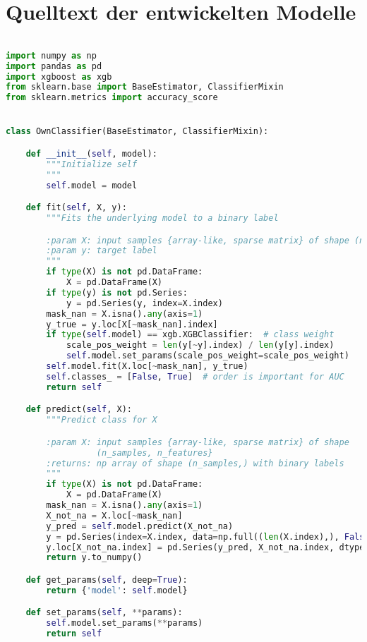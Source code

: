 \chapter{Quelltext der entwickelten Modelle}

\begin{lstlisting}[language=Python, basicstyle=\scriptsize, tabsize=4]

import numpy as np
import pandas as pd
import xgboost as xgb
from sklearn.base import BaseEstimator, ClassifierMixin
from sklearn.metrics import accuracy_score


class OwnClassifier(BaseEstimator, ClassifierMixin):

    def __init__(self, model):
        """Initialize self
        """
        self.model = model

    def fit(self, X, y):
        """Fits the underlying model to a binary label

        :param X: input samples {array-like, sparse matrix} of shape (n_samples, n_features}
        :param y: target label
        """
        if type(X) is not pd.DataFrame:
            X = pd.DataFrame(X)
        if type(y) is not pd.Series:
            y = pd.Series(y, index=X.index)
        mask_nan = X.isna().any(axis=1)
        y_true = y.loc[X[~mask_nan].index]
        if type(self.model) == xgb.XGBClassifier:  # class weight
            scale_pos_weight = len(y[~y].index) / len(y[y].index)
            self.model.set_params(scale_pos_weight=scale_pos_weight)
        self.model.fit(X.loc[~mask_nan], y_true)
        self.classes_ = [False, True]  # order is important for AUC
        return self

    def predict(self, X):
        """Predict class for X

        :param X: input samples {array-like, sparse matrix} of shape
        		  (n_samples, n_features}
        :returns: np array of shape (n_samples,) with binary labels
        """
        if type(X) is not pd.DataFrame:
            X = pd.DataFrame(X)
        mask_nan = X.isna().any(axis=1)
        X_not_na = X.loc[~mask_nan]
        y_pred = self.model.predict(X_not_na)
        y = pd.Series(index=X.index, data=np.full((len(X.index),), False), name='pred')
        y.loc[X_not_na.index] = pd.Series(y_pred, X_not_na.index, dtype=bool)
        return y.to_numpy()

    def get_params(self, deep=True):
        return {'model': self.model}

    def set_params(self, **params):
        self.model.set_params(**params)
        return self


\end{lstlisting}
